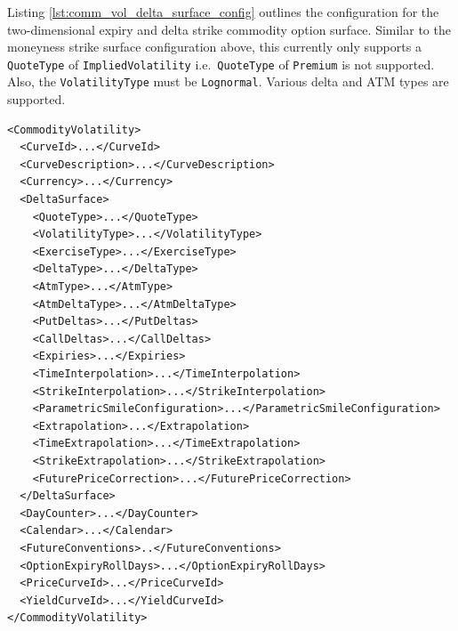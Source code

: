 Listing \ref{lst:comm_vol_delta_surface_config} outlines the configuration for the two-dimensional expiry and delta strike commodity option surface. Similar to the moneyness strike surface configuration above, this currently only supports a \lstinline!QuoteType! of \lstinline!ImpliedVolatility! i.e.\ \lstinline!QuoteType! of \lstinline!Premium! is not supported. Also, the \lstinline!VolatilityType! must be \lstinline!Lognormal!. Various delta and ATM types are supported.

\begin{longlisting}
\begin{verbatim}
<CommodityVolatility>
  <CurveId>...</CurveId>
  <CurveDescription>...</CurveDescription>
  <Currency>...</Currency>
  <DeltaSurface>
    <QuoteType>...</QuoteType>
    <VolatilityType>...</VolatilityType>
    <ExerciseType>...</ExerciseType>
    <DeltaType>...</DeltaType>
    <AtmType>...</AtmType>
    <AtmDeltaType>...</AtmDeltaType>
    <PutDeltas>...</PutDeltas>
    <CallDeltas>...</CallDeltas>
    <Expiries>...</Expiries>
    <TimeInterpolation>...</TimeInterpolation>
    <StrikeInterpolation>...</StrikeInterpolation>
    <ParametricSmileConfiguration>...</ParametricSmileConfiguration>
    <Extrapolation>...</Extrapolation>
    <TimeExtrapolation>...</TimeExtrapolation>
    <StrikeExtrapolation>...</StrikeExtrapolation>
    <FuturePriceCorrection>...</FuturePriceCorrection>
  </DeltaSurface>
  <DayCounter>...</DayCounter>
  <Calendar>...</Calendar>
  <FutureConventions>..</FutureConventions>
  <OptionExpiryRollDays>...</OptionExpiryRollDays>
  <PriceCurveId>...</PriceCurveId>
  <YieldCurveId>...</YieldCurveId>
</CommodityVolatility>
\end{verbatim}
\caption{Expiry and delta strike commodity option surface configuration}
\label{lst:comm_vol_delta_surface_config}
\end{longlisting}

